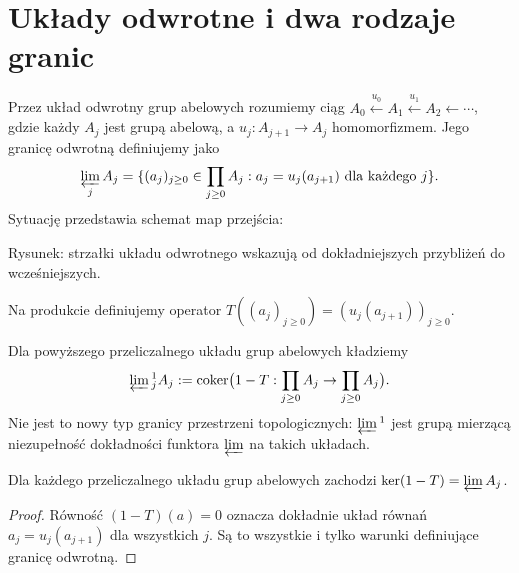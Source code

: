 \section{Układy odwrotne i dwa rodzaje granic}
\begin{definicja}
Przez układ odwrotny grup abelowych rozumiemy ciąg
$A_0\xleftarrow{u_0}A_1\xleftarrow{u_1}A_2\leftarrow\cdots$,
gdzie każdy $A_j$ jest grupą abelową, a $u_j:A_{j+1}\to A_j$
homomorfizmem. Jego granicę odwrotną definiujemy jako
\[
\varprojlim_jA_j=
\{(a_j)_{j\ge0}\in\prod_{j\ge0}A_j:
 a_j=u_j(a_{j+1})\text{ dla każdego }j\}.
\]
Sytuację przedstawia schemat map przejścia:
\begin{center}
\par\smallskip\small Rysunek: strzałki układu odwrotnego wskazują od dokładniejszych przybliżeń do wcześniejszych.
\end{center}
Na produkcie definiujemy operator
$T((a_j)_{j\ge0})=(u_j(a_{j+1}))_{j\ge0}$.
\end{definicja}
\begin{definicja}
Dla powyższego przeliczalnego układu grup abelowych kładziemy
\[
\varprojlim{}^1_jA_j:=
\operatorname{coker}\bigl(1-T:\prod_{j\ge0}A_j\to
\prod_{j\ge0}A_j\bigr).
\]
Nie jest to nowy typ granicy przestrzeni topologicznych:
$\varprojlim{}^1$ jest grupą mierzącą niezupełność dokładności
funktora $\varprojlim$ na takich układach.
\end{definicja}
\begin{lemat}
Dla każdego przeliczalnego układu grup abelowych zachodzi
$\ker(1-T)=\varprojlim A_j$.
\end{lemat}
\begin{proof}
Równość $(1-T)(a)=0$ oznacza dokładnie układ równań
$a_j=u_j(a_{j+1})$ dla wszystkich $j$. Są to wszystkie i tylko
warunki definiujące granicę odwrotną.
\end{proof}


